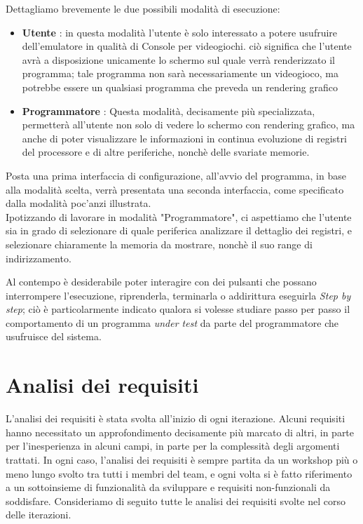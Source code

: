 \documentclass[11pt]{article}
\begin{document}
Dettagliamo brevemente le due possibili modalità di esecuzione:

\begin{itemize}
\item{
\textbf{Utente} : in questa modalità l'utente è solo interessato a potere usufruire dell'emulatore in qualità di Console per videogiochi. ciò significa che l'utente avrà a disposizione unicamente lo schermo sul quale verrà renderizzato il programma; tale programma non sarà necessariamente un videogioco, ma potrebbe essere un qualsiasi programma che preveda un rendering grafico
}
\item{
\textbf{Programmatore} : Questa modalità, decisamente più specializzata, permetterà all'utente non solo di vedere lo schermo con rendering grafico, ma anche di poter visualizzare le informazioni in continua evoluzione di registri del processore e di altre periferiche, nonchè delle svariate memorie.
}
\end{itemize}

Posta una prima interfaccia di configurazione, all'avvio del programma, in base alla modalità scelta, verrà presentata una seconda interfaccia, come specificato dalla modalità poc'anzi illustrata.\\
Ipotizzando di lavorare in modalità "Programmatore", ci aspettiamo che l'utente sia in grado di selezionare di quale periferica analizzare il dettaglio dei registri, e selezionare chiaramente la memoria da mostrare, nonchè il suo range di indirizzamento.

Al contempo è desiderabile poter interagire con dei pulsanti che possano interrompere l'esecuzione, riprenderla, terminarla o addirittura eseguirla \emph{Step by step}; ciò è particolarmente indicato qualora si volesse studiare passo per passo il comportamento di un programma \emph{under test} da parte del programmatore che usufruisce del sistema.\\

\clearpage
\section{Analisi dei requisiti}
L'analisi dei requisiti è stata svolta all'inizio di ogni iterazione. Alcuni requisiti hanno necessitato un approfondimento decisamente più marcato di altri, in parte per l'inesperienza in alcuni campi, in parte per la complessità degli argomenti trattati. In ogni caso, l'analisi dei requisiti è sempre partita da un workshop più o meno lungo svolto tra tutti i membri del team, e ogni volta si è fatto riferimento a un sottoinsieme di funzionalità da sviluppare e requisiti non-funzionali da soddisfare. Consideriamo di seguito tutte le analisi dei requisiti svolte nel corso delle iterazioni.
\end{document}
